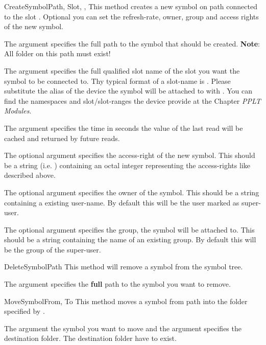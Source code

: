 \begin{methoddesc}[System]{CreateSymbol}{Path, Slot, , }
This method creates a new symbol on path  connected to the slot .
Optional you can set the refresh-rate, owner, group and access rights of the new symbol.

The argument  specifies the full path to the symbol that should be 
created. \textbf{Note}: All folder on this path must exist! 

The argument  specifies the full qualified slot name of the slot you
want the symbol to be connected to. Thy typical format of a slot-name is 
. Please substitute the alias of the device
the symbol will be attached to with . You can find the 
namespaces and slot/slot-ranges the device provide at the Chapter 
\emph{PPLT Modules}.

The argument  specifies the time in seconds the value of the last
read will be cached and returned by future reads.

The optional argument  specifies the access-right of the new symbol.
This should be a string (i.e. ) containing an octal integer 
representing the access-rights like described above.

The optional argument  specifies the owner of the symbol. This
should be a string containing a existing user-name. By default this will be
the user marked as super-user.

The optional argument  specifies the group, the symbol will be 
attached to. This should be a string containing the name of an existing 
group. By default this will be the group of the super-user.
\end{methoddesc}


\begin{methoddesc}[System]{DeleteSymbol}{Path}
This method will remove a symbol from the symbol tree.

The argument  specifies the \textbf{full} path
to the symbol you want to remove. 
\end{methoddesc}


\begin{methoddesc}[System]{MoveSymbol}{From, To}
This method moves a symbol from path  into the folder specified by 
.

The argument  the symbol you want to move and the argument 
 specifies the destination folder. The destination folder have to exist.
\end{methoddesc}


